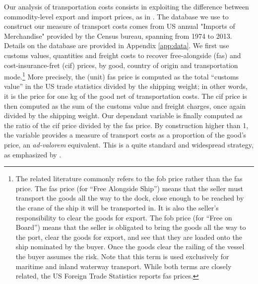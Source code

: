 \documentclass[a4paper,11pt]{article}
\begin{document}
Our analysis of transportation costs consists in exploiting the difference between commodity-level export and import prices, as in \cite{hummels2007}.
The database we use to construct our measure of transport costs comes from US annual "Imports of Merchandise" provided by the Census bureau, spanning from 1974 to 2013.
Details on the database are provided in Appendix \ref{app:data}.
We first use customs values, quantities and freight costs to recover free-alongside (fas) and cost-insurance-fret (cif) prices, by good, country of origin and transportation mode.\footnote{The related literature commonly refers to the fob price rather than the fas price.
The fas price (for ``Free Alongside Ship'') means that the seller must transport the goods all the way to the dock, close enough to be reached by the crane of the ship it will be transported in.
It is also the seller's responsibility to clear the goods for export.
The fob price (for ``Free on Board'') means that the seller is obligated to bring the goods all the way to the port, clear the goods for export, and see that they are loaded onto the ship nominated by the buyer.
Once the goods clear the railing of the vessel the buyer assumes the risk.
Note that this term is used exclusively for maritime and inland waterway transport.
While both terms are closely related, the US Foreign Trade Statistics reports fas prices.} More precisely, the (unit) fas price is computed as the total ``customs value'' in the US trade statistics divided by the shipping weight; in other words, it is the price for one kg of the good net of transportation costs.
The cif price is then computed as the sum of the customs value and freight charges, once again divided by the shipping weight.
Our dependant variable is finally computed as the ratio of the cif price divided by the fas price.
By construction higher than 1, the variable provides a measure of transport costs as a proportion of the good's price, an \emph{ad-valorem} equivalent.
This is a quite standard and widespread strategy, as emphasized by \citet{anderson_wincoop_jel}.
\end{document}
